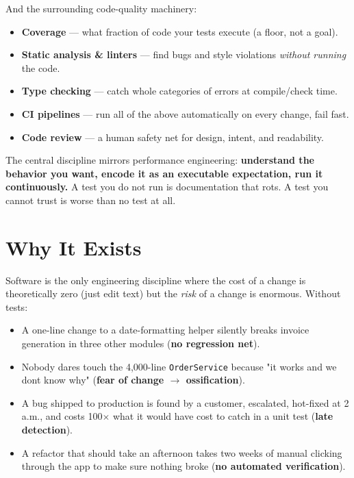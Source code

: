 \documentclass[11pt]{article}
\providecommand{\tightlist}{\setlength{\itemsep}{1pt}\setlength{\parskip}{0pt}}
\begin{document}
And the surrounding code-quality machinery:

\begin{itemize}
\tightlist
\item
  \textbf{Coverage} --- what fraction of code your tests execute (a floor, not a goal).
\item
  \textbf{Static analysis \& linters} --- find bugs and style violations \emph{without running} the code.
\item
  \textbf{Type checking} --- catch whole categories of errors at compile/check time.
\item
  \textbf{CI pipelines} --- run all of the above automatically on every change, fail fast.
\item
  \textbf{Code review} --- a human safety net for design, intent, and readability.
\end{itemize}

The central discipline mirrors performance engineering: \textbf{understand the behavior you want, encode it as an executable expectation, run it continuously.} A test you do not run is documentation that rots. A test you cannot trust is worse than no test at all.

\section{Why It Exists}\label{why-it-exists}

Software is the only engineering discipline where the cost of a change is theoretically zero (just edit text) but the \emph{risk} of a change is enormous. Without tests:

\begin{itemize}
\tightlist
\item
  A one-line change to a date-formatting helper silently breaks invoice generation in three other modules (\textbf{no regression net}).
\item
  Nobody dares touch the 4,000-line \texttt{OrderService} because "it works and we don\textquotesingle t know why" (\textbf{fear of change \(\rightarrow\) ossification}).
\item
  A bug shipped to production is found by a customer, escalated, hot-fixed at 2 a.m., and costs 100\(\times\) what it would have cost to catch in a unit test (\textbf{late detection}).
\item
  A refactor that should take an afternoon takes two weeks of manual clicking through the app to make sure nothing broke (\textbf{no automated verification}).
\end{itemize}
\end{document}

